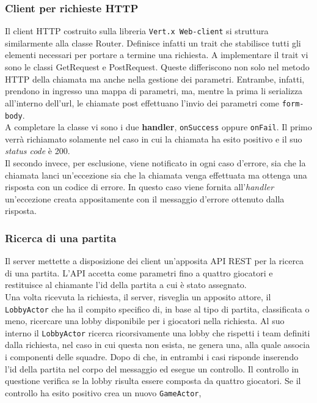 	\subsubsection{Client per richieste HTTP}
	  Il client HTTP costruito sulla libreria \texttt{Vert.x Web-client} si struttura similarmente alla classe Router. Definisce infatti un trait che stabilisce tutti gli elementi necessari per portare a termine una richiesta.
	  A implementare il trait vi sono le classi GetRequest e PostRequest. Queste differiscono non solo nel metodo HTTP della chiamata ma anche nella gestione dei parametri. Entrambe, infatti, prendono in ingresso una mappa di parametri, ma, mentre la prima li serializza all'interno dell'url, le chiamate post effettuano l'invio dei parametri come \texttt{form-body}.\\
	  A completare la classe vi sono i due \textbf{handler}, \texttt{onSuccess} oppure \texttt{onFail}. Il primo verrà richiamato solamente nel caso in cui la chiamata ha esito positivo e il suo \textit{status code} è 200. \\
	  Il secondo invece, per esclusione, viene notificato in ogni caso d'errore, sia che la chiamata lanci un'eccezione sia che la chiamata venga effettuata ma ottenga una risposta con un codice di errore. In questo caso viene fornita all'\textit{handler} un'eccezione creata appositamente con il messaggio d'errore ottenuto dalla risposta.

        \subsubsection{Ricerca di una partita}
          Il server mettette a disposizione dei client un'apposita API REST per la ricerca di una partita. L'API accetta come parametri fino a quattro giocatori e restituisce al chiamante l'id della partita a cui è stato assegnato.
          \\
          Una volta ricevuta la richiesta, il server, risveglia un apposito attore, il \texttt{LobbyActor} che ha il compito specifico di, in base al tipo di partita, classificata o meno, ricercare una lobby disponibile per i giocatori nella richiesta. Al suo interno il \texttt{LobbyActor} ricerca ricorsivamente una lobby che rispetti i team definiti dalla richiesta, nel caso in cui questa non esista, ne genera una, alla quale associa i componenti delle squadre. Dopo di che, in entrambi i casi risponde inserendo l'id della partita nel corpo del messaggio ed esegue un controllo. Il controllo in questione verifica se la lobby risulta essere composta da quattro giocatori. Se il controllo ha esito positivo crea un nuovo \texttt{GameActor},
        
